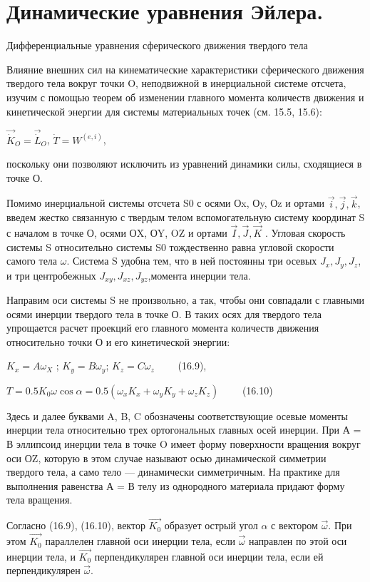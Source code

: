 {\section{Динамические уравнения Эйлера.}
\begin{center}
    \par Дифференциальные уравнения сферического движения  твердого тела
    \par Влияние внешних сил на кинематические характеристики сферического движения твердого тела вокруг точки O, неподвижной в инерциальной системе отсчета, изучим с помощью  теорем об изменении главного момента количеств движения и кинетической энергии для системы материальных точек (см. 15.5, 15.6):
    \par $ \vec{\dot{K}}_O = \vec{\dot{L}}_O$, $\dot{T} = W^{(e,i)} $,
    \par поскольку они позволяют исключить из уравнений динамики  силы, сходящиеся в точке О.
    \par Помимо инерциальной системы отсчета S0 с осями Оx, Оy, Оz и ортами $ \vec{i}, \vec{j}, \vec{k} $, введем жестко связанную с твердым телом вспомогательную систему координат S с началом в точке О, осями ОX, ОY, OZ и ортами $ \vec{I}, \vec{J}, \vec{K} $ .  Угловая скорость системы S относительно системы S0 тождественно  равна угловой скорости самого тела $\omega$. Система S удобна тем, что в ней постоянны три осевых $J_x,J_y,J_z $, и три центробежных $J_{xy}, J_{xz}, J_{yz} $,момента инерции тела.
    \par Направим оси системы S не произвольно, а так, чтобы они совпадали с главными осями инерции твердого тела в точке О. В таких осях для твердого тела упрощается расчет проекций его главного момента количеств движения относительно точки О и его кинетической энергии:
    \par $K_x = A \omega_X $ ; $K_y = B \omega_y $; $K_z = C \omega_z \qquad$ (16.9), 
    \par $ T = 0.5 K_0 \omega \cos{\alpha}= 0.5 (\omega_x K_x + \omega_y K_y + \omega_z K_z) \qquad$ (16.10)
    \par Здесь и далее буквами A, B, C обозначены соответствующие осевые моменты инерции тела относительно трех ортогональных главных осей инерции. При   А = В эллипсоид инерции тела в точке O имеет форму поверхности вращения вокруг оси ОZ, которую в этом случае называют осью динамической симметрии твердого тела, а само тело — динамически симметричным. На практике для выполнения равенства А = В телу из однородного материала придают форму тела вращения.
    \par Согласно (16.9), (16.10), вектор $\vec{K_0}$ образует острый угол $\alpha$ с вектором $\vec{\omega}$.  При этом $\vec{K_0}$ параллелен главной оси инерции тела, если $\vec{\omega}$ направлен по этой оси  инерции тела, и  $\vec{K_0}$ перпендикулярен  главной оси  инерции тела, если ей перпендикулярен $\vec{\omega}$.

\end{center}}
